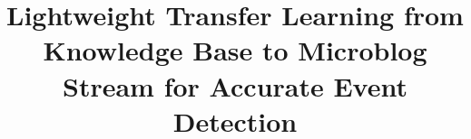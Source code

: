 \documentclass{article}
\begin{document}
%
\title{Lightweight Transfer Learning from Knowledge Base to Microblog Stream for Accurate Event Detection}
\maketitle




\end{document}
